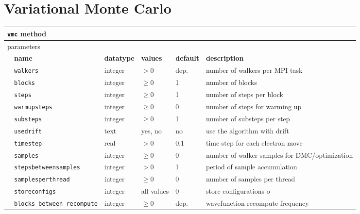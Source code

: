 \section{Variational Monte Carlo}
\label{sec:vmc}

\begin{table}[h]
\begin{center}
\begin{tabularx}{\textwidth}{l l l l l l }
\hline
\multicolumn{6}{l}{\texttt{vmc} method} \\
\hline
\multicolumn{2}{l}{parameters}  & \multicolumn{4}{l}{}\\
   &   \bfseries name     & \bfseries datatype & \bfseries values & \bfseries default   & \bfseries description \\
   &   \texttt{walkers             } &  integer  & $> 0$   & dep.& number of walkers per MPI task  \\
   &   \texttt{blocks              } &  integer  & $\ge 0$ & 1   & number of blocks            \\
   &   \texttt{steps               } &  integer  & $\ge 0$ & 1   & number of steps per block   \\
   &   \texttt{warmupsteps         } &  integer  & $\ge 0$ & 0   & number of steps for warming up\\
   &   \texttt{substeps            } &  integer  & $\ge 0$ & 1   & number of substeps per step \\
   &   \texttt{usedrift            } &  text     & yes, no & no  & use the algorithm with drift\\
   &   \texttt{timestep            } &  real     & $> 0$   & 0.1 & time step for each electron move \\
   &   \texttt{samples             } &  integer  & $\ge 0$ & 0   & number of walker samples for DMC/optimization\\
   &   \texttt{stepsbetweensamples } &  integer  & $> 0$   & 1   & period of sample accumulation\\
   &   \texttt{samplesperthread    } &  integer  & $\ge 0$ & 0   & number of samples per thread  \\
   &   \texttt{storeconfigs        } &  integer  & all values & 0   & store configurations o  \\
   &   \texttt{blocks\_between\_recompute} &  integer  & $\ge 0$ & dep.  & wavefunction recompute frequency  \\
  \hline
\end{tabularx}
\end{center}
\end{table}

